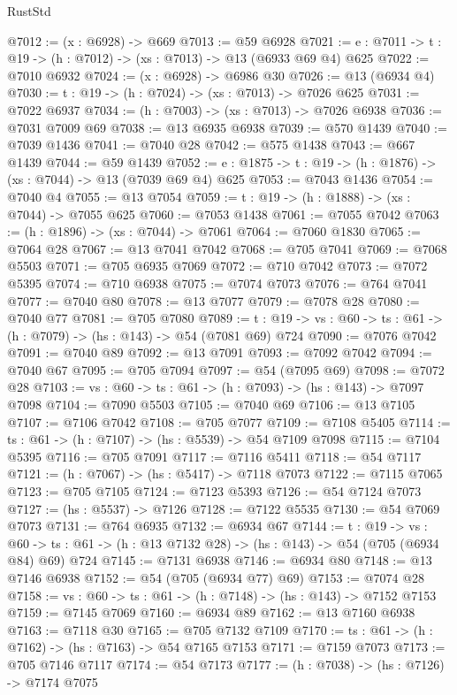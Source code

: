 \begin{lexlean}{RustStd}
\begin{coremodule}
@7012 := (x : @6928) -> @669
@7013 := @59 @6928
@7021 := {e : @7011} -> {t : @19} -> (h : @7012) -> (xs : @7013) -> @13 (@6933 @69 @4) @625
@7022 := @7010 @6932
@7024 := (x : @6928) -> @6986 @30
@7026 := @13 (@6934 @4)
@7030 := {t : @19} -> (h : @7024) -> (xs : @7013) -> @7026 @625
@7031 := @7022 @6937
@7034 := (h : @7003) -> (xs : @7013) -> @7026 @6938
@7036 := @7031 @7009 @69
@7038 := @13 @6935 @6938
@7039 := @570 @1439
@7040 := @7039 @1436
@7041 := @7040 @28
@7042 := @575 @1438
@7043 := @667 @1439
@7044 := @59 @1439
@7052 := {e : @1875} -> {t : @19} -> (h : @1876) -> (xs : @7044) -> @13 (@7039 @69 @4) @625
@7053 := @7043 @1436
@7054 := @7040 @4
@7055 := @13 @7054
@7059 := {t : @19} -> (h : @1888) -> (xs : @7044) -> @7055 @625
@7060 := @7053 @1438
@7061 := @7055 @7042
@7063 := (h : @1896) -> (xs : @7044) -> @7061
@7064 := @7060 @1830
@7065 := @7064 @28
@7067 := @13 @7041 @7042
@7068 := @705 @7041
@7069 := @7068 @5503
@7071 := @705 @6935 @7069
@7072 := @710 @7042
@7073 := @7072 @5395
@7074 := @710 @6938
@7075 := @7074 @7073
@7076 := @764 @7041
@7077 := @7040 @80
@7078 := @13 @7077
@7079 := @7078 @28
@7080 := @7040 @77
@7081 := @705 @7080
@7089 := {t : @19} -> {vs : @60} -> {ts : @61} -> (h : @7079) -> (hs : @143) -> @54 (@7081 @69) @724
@7090 := @7076 @7042
@7091 := @7040 @89
@7092 := @13 @7091
@7093 := @7092 @7042
@7094 := @7040 @67
@7095 := @705 @7094
@7097 := @54 (@7095 @69)
@7098 := @7072 @28
@7103 := {vs : @60} -> {ts : @61} -> (h : @7093) -> (hs : @143) -> @7097 @7098
@7104 := @7090 @5503
@7105 := @7040 @69
@7106 := @13 @7105
@7107 := @7106 @7042
@7108 := @705 @7077
@7109 := @7108 @5405
@7114 := {ts : @61} -> (h : @7107) -> (hs : @5539) -> @54 @7109 @7098
@7115 := @7104 @5395
@7116 := @705 @7091
@7117 := @7116 @5411
@7118 := @54 @7117
@7121 := (h : @7067) -> (hs : @5417) -> @7118 @7073
@7122 := @7115 @7065
@7123 := @705 @7105
@7124 := @7123 @5393
@7126 := @54 @7124 @7073
@7127 := (hs : @5537) -> @7126
@7128 := @7122 @5535
@7130 := @54 @7069 @7073
@7131 := @764 @6935
@7132 := @6934 @67
@7144 := {t : @19} ->
  {vs : @60} -> {ts : @61} -> (h : @13 @7132 @28) -> (hs : @143) -> @54 (@705 (@6934 @84) @69) @724
@7145 := @7131 @6938
@7146 := @6934 @80
@7148 := @13 @7146 @6938
@7152 := @54 (@705 (@6934 @77) @69)
@7153 := @7074 @28
@7158 := {vs : @60} -> {ts : @61} -> (h : @7148) -> (hs : @143) -> @7152 @7153
@7159 := @7145 @7069
@7160 := @6934 @89
@7162 := @13 @7160 @6938
@7163 := @7118 @30
@7165 := @705 @7132 @7109
@7170 := {ts : @61} -> (h : @7162) -> (hs : @7163) -> @54 @7165 @7153
@7171 := @7159 @7073
@7173 := @705 @7146 @7117
@7174 := @54 @7173
@7177 := (h : @7038) -> (hs : @7126) -> @7174 @7075

\end{coremodule}
\end{lexlean}
